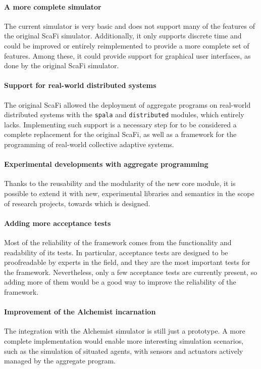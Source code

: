 \paragraph{A more complete simulator} The current simulator is very basic and does not support many of the features of the original ScaFi simulator.
%
Additionally, it only supports discrete time and could be improved or entirely reimplemented to provide a more complete set of features.
%
Among these, it could provide support for graphical user interfaces, as done by the original ScaFi simulator.

\paragraph{Support for real-world distributed systems} The original ScaFi allowed the deployment of aggregate programs on real-world distributed systems with the \texttt{spala} and \texttt{distributed} modules, which \this entirely lacks.
%
Implementing such support is a necessary step for \this to be considered a complete replacement for the original ScaFi, as well as a framework for the programming of real-world collective adaptive systems.

\paragraph{Experimental developments with aggregate programming} Thanks to the reusability and the modularity of the new core module, it is possible to extend it with new, experimental libraries and semantics in the scope of research projects, towards which \this is designed.

\paragraph{Adding more acceptance tests} Most of the reliability of the framework comes from the functionality and readability of its tests.
%
In particular, acceptance tests are designed to be proofreadable by experts in the field, and they are the most important tests for the framework.
%
Nevertheless, only a few acceptance tests are currently present, so adding more of them would be a good way to improve the reliability of the framework.

\paragraph{Improvement of the Alchemist incarnation} The integration with the Alchemist simulator is still just a prototype.
%
A more complete implementation would enable more interesting simulation scenarios, such as the simulation of situated agents, with sensors and actuators actively managed by the aggregate program.

